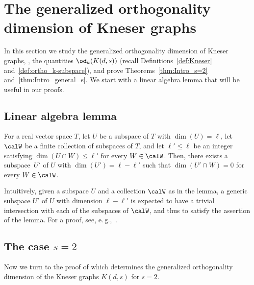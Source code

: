 \section{The generalized orthogonality dimension of Kneser graphs}\label{sec:GenODofKneser}

In this section we study the generalized orthogonality dimension
%
%
of Kneser graphs, %
\ie,   %
the quantities $\od_k(K(d,s))$ (recall Definitions~\ref{def:Kneser} and~\ref{def:ortho_k-subspace}), and prove Theorems~\ref{thm:Intro_s=2} and~\ref{thm:Intro_general_s}.
We start with a linear algebra lemma that will be useful in our proofs.

\subsection{Linear algebra lemma}

%
%
%
%
\begin{lemma}\label{lem_cor:good_subspace}
For a real vector space $T$, let $U$ be a subspace of $T$ with $\dim(U) = \ell$, let $\calW$ be a finite collection of subspaces of $T$, and let $\ell' \leq \ell$ be an integer satisfying $\dim(U \cap W) \leq \ell'$ for every $W \in \calW$. Then, there exists a subspace~$U'$ of $U$ with $\dim(U')=\ell-\ell'$ such that $\dim(U' \cap W) = 0$ for every $W \in \calW$.
\end{lemma}

%
%

Intuitively, given a subspace $U$ and a collection $\calW$ as in the lemma, a
%
generic  %
subspace $U'$ of $U$ with dimension $\ell-\ell'$ is expected to have a trivial intersection with each of the subspaces of $\calW$, and thus to satisfy the assertion of the lemma.
%
%
For a proof, see, e.\,g.,~\cite[Chapter~3.1.4]{BabaiF20}.
%

%
%
%
%
%
%
%
%
%
%
%
%
%
%
%
%
%
%
%
%
%
%
%
%
%
%
%
%
%
%
%
%
%
%
%
%
%
%
%
%
%
%
%
%
%
%
%
%
%
%
%
%
%
%
%
%
%
%
%
%
%
%
%
%
%

\subsection{The case \texorpdfstring{$s=2$}{s=2}}

%
Now we turn to the proof of %
 which determines the generalized orthogonality dimension %
of the  %
Kneser graphs $K(d,s)$ for $s=2$.

